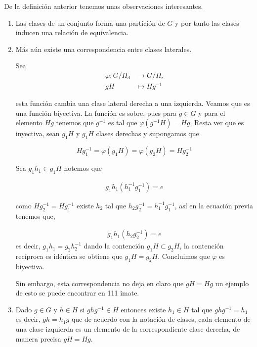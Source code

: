 \begin{ob}
De la definición anterior tenemos unas observaciones interesantes. 

	\begin{enumerate}
	\item Las clases de un conjunto forma una partición de $G$ y por tanto las clases inducen una relación de equivalencia.
	\item Más aún existe una correspondencia entre clases laterales.
	
 Sea 
    \begin{align*}
    \varphi:G/H_d & \to G/H_i \\
    gH & \mapsto Hg^{-1}
    \end{align*} 
 
  esta función cambia una clase lateral derecha a una izquierda. Veamos que es una función biyectiva. La función es sobre, pues para $g \in G$ y para el elemento $Hg$ tenemos que $g^{-1}$ es tal que $\varphi(g^{-1}H)=Hg$. Resta ver que es inyectiva, sean $g_1H$ y $g_1H$ clases derechas y supongamos que
	
	 $$Hg_1^{-1}=\varphi(g_1H)=\varphi(g_2H)=Hg_2^{-1}$$ 
	
	Sea $g_1h_1 \in g_1H$ notemos que

	\begin{align*}
	g_1h_1(h_1^{-1}g_1^{-1})=e	
	\end{align*}
	
	como $Hg_2^{-1}=Hg_1^{-1}$ existe $h_2$ tal que $h_2g_2^{-1}=h_1^{-1}g_1^{-1}$, así en la ecuación previa tenemos que, 
	
	\begin{align*}
	g_1h_1(h_2g_2^{-1})=e	
	\end{align*} 
	es decir, $g_1h_1=g_2h_2^{-1}$ dando la contención $g_1H \subset g_2H$, la contención recíproca es idéntica se obtiene que $g_1H=g_2H$. Concluimos que $\varphi$ es biyectiva. 
	
	Sin embargo, esta correspondencia no deja en claro que $gH=Hg$ un ejemplo de esto se puede encontrar en 111 imate.
	
	 \item Dado $g \in G$ y $h \in H$ si $ghg^{-1} \in H$ entonces existe $h_1 \in H$ tal que $ghg^{-1}=h_1$ es decir, $gh=h_1g$  que de acuerdo con la notación de clases, cada elemento de una clase izquierda es un elemento de la correspondiente clase derecha, de manera precisa $gH=Hg$.
	 \end{enumerate}
	\end{ob}
	
